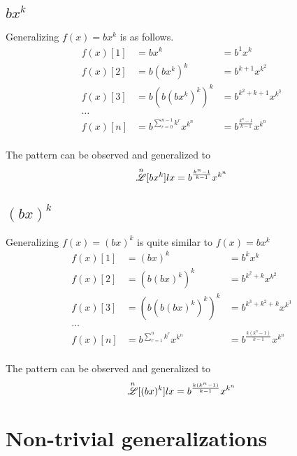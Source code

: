\documentclass[12pt, letterpaper]{article}
\begin{document}
\subsection{$bx^k$}
Generalizing {$f(x) = bx^{k}$} is as follows.
\begin{align*}
    f(x)[1] &= bx^{k}             &= b^{1}x^{k} \\
    f(x)[2] &= b(bx^{k}) ^{k}       &= b^{k+1}x^{k^{2}} \\
    f(x)[3] &= b(b(bx^{k})^{k})^{k} &= b^{k^{2} + k + 1} x^{k^{3}} \\
       \dots \\
    f(x)[n] &= b^{\displaystyle \sum_{r=0}^{n-1} k^{r}} x^{k^{n}}  &= b^{\frac{k^{n}-1}{k-1}}x^{k^{n}}
\end{align*}
\\The pattern can be observed and generalized to
$$\overset{n}{\mathscr{L}} [bx^k] lx = b^{\frac{k^{n}-1}{k-1}}x^{k^{n}}$$

\subsection{$(bx)^k$}
Generalizing {$f(x) = (bx)^{k}$} is quite similar to {$f(x) = bx^k$}
\begin{align*}
    f(x)[1] &= (bx)^{k}             &= b^{k}x^{k} \\
    f(x)[2] &= (b(bx)^{k})^{k}       &= b^{k^{2}+k}x^{k^{2}} \\
    f(x)[3] &= (b(b(bx)^{k})^{k})^{k} &= b^{k^{3} + k^{2} + k} x^{k^{3}} \\
       \dots \\
    f(x)[n] &= b^{\sum_{r=1}^{n} k^{r}} x^{k^{n}}  &= b^{\frac{k(k^{n}-1)}{k-1}}x^{k^{n}}
\end{align*}
\\The pattern can be observed and generalized to
$$\overset{n}{\mathscr{L}} [(bx)^k] lx = b^{\frac{k(k^{n}-1)}{k-1}}x^{k^{n}}$$

\newpage
\section{Non-trivial generalizations}
\end{document}
